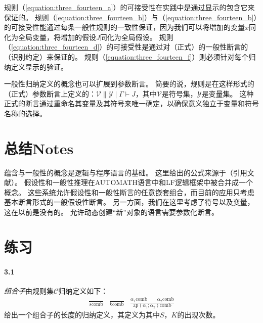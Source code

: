 规则（\ref{equation:three_fourteen_a}）的可接受性在实践中是通过显示的包含它来保证的。
规则（\ref{equation:three_fourteen_b}）与（\ref{equation:three_fourteen_b}）的可接受性能通过每条一般性规则的一致性保证，因为我们可以将增加的变量$x$同化为全局变量，将增加的假设$J$同化为全局假设。
规则（\ref{equation:three_fourteen_d}）的可接受性是通过对（正式）的一般性断言的（识别约定）来保证的。
规则（\ref{equation:three_fourteen_f}）则必须针对每个归纳定义显示的验证。

一般性归纳定义的概念也可以扩展到参数断言。
简要的说，规则是在这样形式的（正式）参数断言上定义的：$\mathcal{V} \parallel \mathcal{Y} \mid \Gamma \vdash J$，其中$\mathcal{V}$是符号集，$\mathcal{Y}$是变量集。
这种正式的断言通过重命名其变量及其符号来唯一确定，以确保意义独立于变量和符号名称的选择。

\section{总结Notes}

蕴含与一般性的概念是逻辑与程序语言的基础。
这里给出的公式来源于（引用文献）。
假设性和一般性推理在AUTOMATH语言中和LF逻辑框架中被合并成一个概念。
这些系统允许假设性和一般性断言的任意嵌套组合，而目前的应用只考虑基本断言形式的一般假设性断言。
另一方面，我们在这里考虑了符号以及变量，这在以前是没有的。
允许动态创建“新”对象的语言需要参数化断言。

\section*{练习}

\paragraph{3.1} 
\textit{组合子}由规则集$\mathcal{C}$归纳定义如下：
\begin{subequations}
    \begin{align}
        \frac{}{s \text{comb}} 
    \end{align}
    \begin{align}
        \frac{}{k \text{comb}} 
    \end{align}
    \begin{align}
        \frac{\alpha_1 \text{comb} \qquad \alpha_2 \text{comb}}{\text{ap}(\alpha_1 ; \alpha_2) \text{comb}} 
    \end{align}
\end{subequations}
给出一个组合子的长度的归纳定义，其定义为其中$S$，$K$的出现次数。

